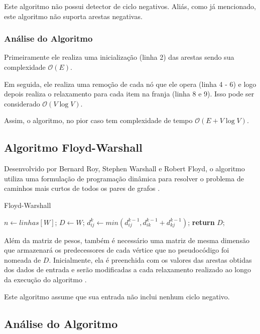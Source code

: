 \documentclass[12pt]{article}
\begin{document}
Este algoritmo não possui detector de ciclo negativos. Aliás, como já mencionado, este algoritmo não suporta arestas negativas.


\subsubsection{Análise do Algoritmo}

Primeiramente ele realiza uma inicialização (linha 2) das arestas sendo sua complexidade  $\mathcal{O}(E)$.

Em seguida, ele realiza uma remoção de cada nó que ele opera (linha 4 - 6) e logo depois realiza o relaxamento para cada item na franja (linha 8 e 9). Isso pode ser considerado $\mathcal{O}(V\log V)$.

Assim, o algoritmo, no pior caso tem complexidade de tempo $\mathcal{O}(E + V\log V)$.

\subsection{Algoritmo Floyd-Warshall}

Desenvolvido por Bernard Roy, Stephen Warshall e Robert Floyd, o algoritmo utiliza uma formulação de programação dinâmica para resolver o problema de caminhos mais curtos de todos os pares de grafos \cite{cormen2002algoritmos}.


\begin{algorithm}[H]
\caption{Floyd-Warshall}\label{alg:fw}
\begin{algorithmic}[1]
	\State $n \gets linhas[W]$;
   \State $D\gets W$;
           \State $d^k_{ij} \gets min(d^{k-1}_{ij}, d^{k-1}_{ik} + d^{k-1}_{kj})$;
       \EndFor
     \EndFor
   \EndFor
   \State \textbf{return} $D$;
\EndProcedure
\end{algorithmic}
\end{algorithm}


Além da matriz de pesos, também é necessário uma matriz de mesma dimensão que armazenará os predecessores de cada vértice que no pseudocódigo foi nomeada de $D$. Inicialmente, ela é preenchida com os valores das arestas obtidas dos dados de entrada e serão modificadas a cada relaxamento realizado ao longo da execução do algoritmo \cite{cormen2002algoritmos}.

Este algoritmo assume que sua entrada não inclui nenhum ciclo negativo.

\subsection{Análise do Algoritmo}
\end{document}
